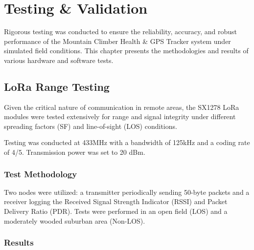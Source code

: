 \chapter{Testing \& Validation}
\label{ch:testing}

Rigorous testing was conducted to ensure the reliability, accuracy, and robust performance of the Mountain Climber Health \& GPS Tracker system under simulated field conditions. This chapter presents the methodologies and results of various hardware and software tests.

\section{LoRa Range Testing}
\label{sec:lora_range}

Given the critical nature of communication in remote areas, the SX1278 LoRa modules were tested extensively for range and signal integrity under different spreading factors (SF) and line-of-sight (LOS) conditions.

\begin{infobox}
Testing was conducted at 433MHz with a bandwidth of 125kHz and a coding rate of 4/5. Transmission power was set to 20 dBm.
\end{infobox}

\subsection{Test Methodology}
Two nodes were utilized: a transmitter periodically sending 50-byte packets and a receiver logging the Received Signal Strength Indicator (RSSI) and Packet Delivery Ratio (PDR). Tests were performed in an open field (LOS) and a moderately wooded suburban area (Non-LOS).

\subsection{Results}


